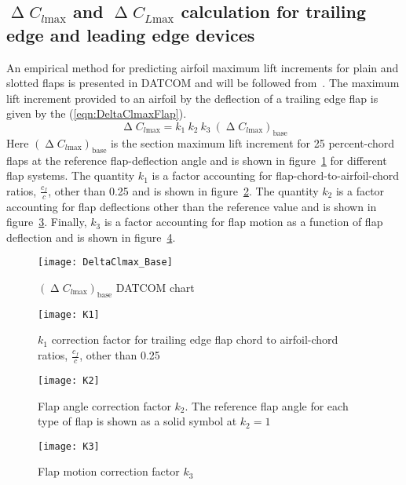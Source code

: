 \subsection{$\upDelta C_{l\text{max}}$ and  $\upDelta C_{L\text{max}}$ calculation for trailing edge and leading edge devices}
An empirical method for predicting airfoil maximum lift increments for plain and slotted flaps is presented in \gls{DATCOM} and will be followed from~\cite{sforza2014commercial}.
%
The maximum lift increment provided to an airfoil by the deflection of a trailing edge flap is given by the (\ref{eqn:DeltaClmaxFlap}).
%
\begin{equation}
\upDelta C_{l\text{max}}=k_1\ k_2\ k_3\ \left(\upDelta C_{l\text{max}}\right)_{\text{base}}
\label{eqn:DeltaClmaxFlap}
\end{equation}
%
\noindent
Here $\left(\upDelta C_{l\text{max}}\right)_{\text{base}}$ is the section maximum lift increment for 25 percent-chord flaps at the reference flap-deflection angle and is shown in figure~\ref{fig:DeltaClmaxBase} for different flap systems. The quantity $k_1$ is a factor accounting for flap-chord-to-airfoil-chord ratios, $\frac{c_{f}}{c}$, other than 0.25 and is shown in figure~\ref{fig:k1}. The quantity $k_2$ is a factor accounting for flap deflections other than the reference value and is shown in figure~\ref{fig:k2}. Finally, $k_3$ is a factor accounting for flap motion as a function of flap deflection and is shown in figure~\ref{fig:k3}.
%
\begin{figure}[!b]
  \centering
  \texttt{[image: DeltaClmax\_Base]}
  \caption{$\left(\upDelta C_{l\text{max}}\right)_{\text{base}}$ DATCOM chart}
  \label{fig:DeltaClmaxBase}
\end{figure}
%
\begin{figure}[H]
  \centering
  \texttt{[image: K1]}
  \caption{$k_1$ correction factor for trailing edge flap chord to airfoil-chord ratios, $\frac{c_{f}}{c}$, other than 0.25}
  \label{fig:k1}
\end{figure}
%
\begin{figure}[H]
\centering
\texttt{[image: K2]}
\caption{Flap angle correction factor $k_2$. The reference flap angle for each type of flap is shown as a solid symbol at $k_2=1$}
\label{fig:k2}
\end{figure}
%
\begin{figure}[H]
\centering
\texttt{[image: K3]}
\caption{Flap motion correction factor $k_3$}
\label{fig:k3}
\end{figure}
